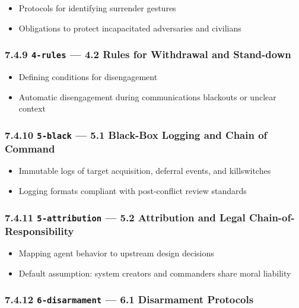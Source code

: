 \documentclass[11pt]{article}
\begin{document}
\begin{itemize}\setlength\itemsep{0pt}
\item Protocols for identifying surrender gestures
\item Obligations to protect incapacitated adversaries and civilians
\end{itemize}


\subsubsection*{7.4.9 \texttt{4-rules} — 4.2 Rules for Withdrawal and Stand-down}


\begin{itemize}\setlength\itemsep{0pt}
\item Defining conditions for disengagement
\item Automatic disengagement during communications blackouts or unclear context
\end{itemize}


\subsubsection*{7.4.10 \texttt{5-black} — 5.1 Black-Box Logging and Chain of Command}


\begin{itemize}\setlength\itemsep{0pt}
\item Immutable logs of target acquisition, deferral events, and killswitches
\item Logging formats compliant with post-conflict review standards
\end{itemize}


\subsubsection*{7.4.11 \texttt{5-attribution} — 5.2 Attribution and Legal Chain-of-Responsibility}


\begin{itemize}\setlength\itemsep{0pt}
\item Mapping agent behavior to upstream design decisions
\item Default assumption: system creators and commanders share moral liability
\end{itemize}


\subsubsection*{7.4.12 \texttt{6-disarmament} — 6.1 Disarmament Protocols}
\end{document}
